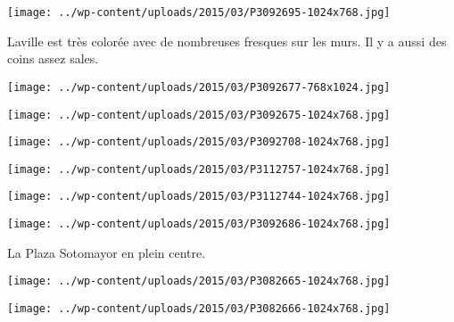  

\begin{center} \texttt{[image: ../wp-content/uploads/2015/03/P3092695-1024x768.jpg]} \end{center}

Laville est très colorée avec de nombreuses fresques sur les murs. Il y a aussi des coins assez sales.

 

\begin{center} \texttt{[image: ../wp-content/uploads/2015/03/P3092677-768x1024.jpg]} \end{center}

 

\begin{center} \texttt{[image: ../wp-content/uploads/2015/03/P3092675-1024x768.jpg]} \end{center}

 

\begin{center} \texttt{[image: ../wp-content/uploads/2015/03/P3092708-1024x768.jpg]} \end{center}

 

\begin{center} \texttt{[image: ../wp-content/uploads/2015/03/P3112757-1024x768.jpg]} \end{center}

 

\begin{center} \texttt{[image: ../wp-content/uploads/2015/03/P3112744-1024x768.jpg]} \end{center}

 

\begin{center} \texttt{[image: ../wp-content/uploads/2015/03/P3092686-1024x768.jpg]} \end{center}



 La Plaza Sotomayor en plein centre.

 

\begin{center} \texttt{[image: ../wp-content/uploads/2015/03/P3082665-1024x768.jpg]} \end{center}

 

\begin{center} \texttt{[image: ../wp-content/uploads/2015/03/P3082666-1024x768.jpg]} \end{center}



